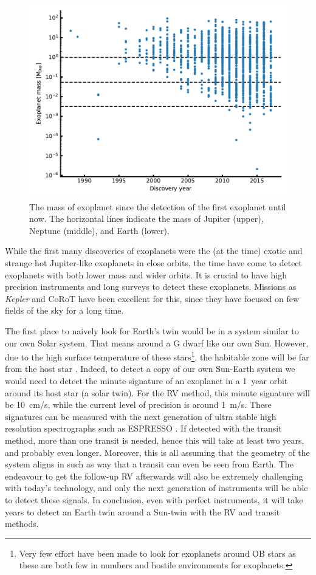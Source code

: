 \begin{figure}[htpb!]
    \centering
    \includegraphics[width=0.8\linewidth]{figures/exoplanetMass.pdf}
    \caption{The mass of exoplanet since the detection of the first exoplanet until now. The
             horizontal lines indicate the mass of Jupiter (upper), Neptune (middle), and Earth
             (lower).}
    \label{fig:exoplanetMass}
\end{figure}

While the first many discoveries of exoplanets were the (at the time) exotic and strange hot
Jupiter-like exoplanets in close orbits, the time have come to detect exoplanets with both lower
mass and wider orbits. It is crucial to have high precision instruments and long surveys to detect
these exoplanets. Missions as \emph{Kepler} and CoRoT have been excellent for this, since they have
focused on few fields of the sky for a long time.

The first place to naively look for Earth's twin would be in a system similar to our own Solar
system. That means around a G dwarf like our own Sun. However, due to the high surface temperature
of these stars\footnote{Very few effort have been made to look for exoplanets around OB stars as
these are both few in numbers and hostile environments for exoplanets.}, the habitable zone will be
far from the host star \citep[see e.g.][]{Kasting1993}. Indeed, to detect a copy of our own
Sun-Earth system we would need to detect the minute signature of an exoplanet in a \SI{1}{year}
orbit around its host star (a solar twin). For the RV method, this minute signature will be
\SI{10}{cm/s}, while the current level of precision is around \SI{1}{m/s}. These signatures can be
measured with the next generation of ultra stable high resolution spectrographs such as ESPRESSO
\citep{ESPRESSO}. If detected with the transit method, more than one transit is needed, hence this
will take at least two years, and probably even longer. Moreover, this is all assuming that the
geometry of the system aligns in such as way that a transit can even be seen from Earth. The
endeavour to get the follow-up RV afterwards will also be extremely challenging with today's
technology, and only the next generation of instruments will be able to detect these signals. In
conclusion, even with perfect instruments, it will take years to detect an Earth twin around a
Sun-twin with the RV and transit methods.

